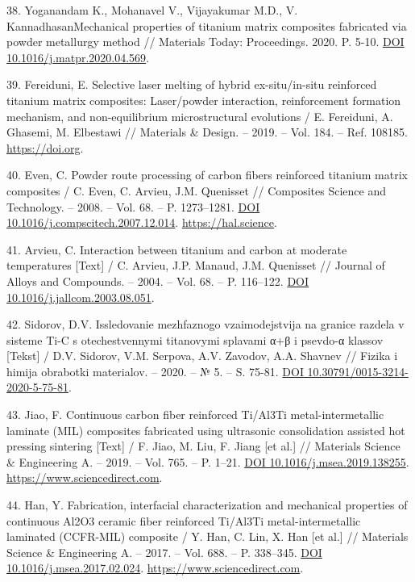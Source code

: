 \begin{references}
38. Yoganandam K., Mohanavel V., Vijayakumar M.D.,
V. KannadhasanMechanical properties of titanium matrix composites
fabricated via powder metallurgy method // Materials Today:
Proceedings. 2020. P. 5-10. \href{https://doi.org/10.1016/j.matpr.2020.04.569}{DOI 10.1016/j.matpr.2020.04.569}.

39. Fereiduni, E. Selective laser melting of hybrid ex-situ/in-situ
reinforced titanium matrix composites: Laser/powder interaction,
reinforcement formation mechanism, and non-equilibrium microstructural
evo\-lutions / E. Fereiduni, A. Ghasemi, M. Elbestawi // Materials \&
Design. – 2019. – Vol. 184. –
Ref. 108185. \href{https://doi.org/10.1016/j.matdes.2019.108185}{https://doi.org}.

40. Even, C. Powder route processing of carbon fibers reinforced
titanium matrix composites / C. Even, C. Arvieu, J.M. Quenisset //
Composites Science and Technology. – 2008. – Vol. 68. –
P. 1273–1281. \href{http://dx.doi.org/10.1016/j.compscitech.2007.12.014}{DOI 10.1016/j.compscitech.2007.12.014}. \href{https://hal.science/hal-00550280v1}{https://hal.science}.

41. Arvieu, C. Interaction between titanium and carbon at moderate
temperatures [Text] / C. Arvieu, J.P. Manaud, J.M. Quenisset //
Journal of Alloys and Compounds. – 2004. – Vol. 68. –
P. 116–122. \href{http://dx.doi.org/10.1016/j.jallcom.2003.08.051}{DOI 10.1016/j.jallcom.2003.08.051}.

42. Sidorov, D.V. Issledovanie mezhfaznogo vzaimodejstvija na granice
razdela v sisteme Ti-C s otechestv\-ennymi titanovymi splavami α+β i
psevdo-α klassov [Tekst] / D.V. Sidorov, V.M. Serpova, A.V. Zavodov,
A.A. Shavnev // Fizika i himija obrabotki materialov. – 2020. – № 5. –
S. 75-81. \href{https://doi.org/10.30791/0015-3214-2020-5-75-81}{DOI 10.30791/0015-3214-2020-5-75-81}.

43. Jiao, F. Continuous carbon fiber reinforced Ti/Al3Ti
metal-intermetallic laminate (MIL) composites fabricated using
ultrasonic consolidation assisted hot pressing sintering [Text] /
F. Jiao, M. Liu, F. Jiang [et al.] // Materials Science \& Engineering
A. – 2019. – Vol. 765. –
P. 1–21. \href{http://dx.doi.org/10.1016/j.msea.2019.138255}{DOI 10.1016/j.msea.2019.138255}. \\\href{https://www.sciencedirect.com/science/article/abs/pii/S092150931931041X?via\%3Dihub}{https://www.sciencedirect.com}.

44. Han, Y. Fabrication, interfacial characterization and mechanical
properties of continuous Al2O3 cera\-mic fiber reinforced Ti/Al3Ti
metal-intermetallic laminated (CCFR-MIL) composite / Y. Han, C. Lin,
X. Han [et al.] // Materials Science \& Engineering A. – 2017. –
Vol. 688. –
P. 338–345. \href{http://dx.doi.org/10.1016/j.msea.2017.02.024}{DOI \\10.1016/j.msea.2017.02.024}. \href{https://www.sciencedirect.com/science/article/abs/pii/S0921509317301818?via\%3Dihub}{https://www.sciencedirect.com}.


\end{references}

